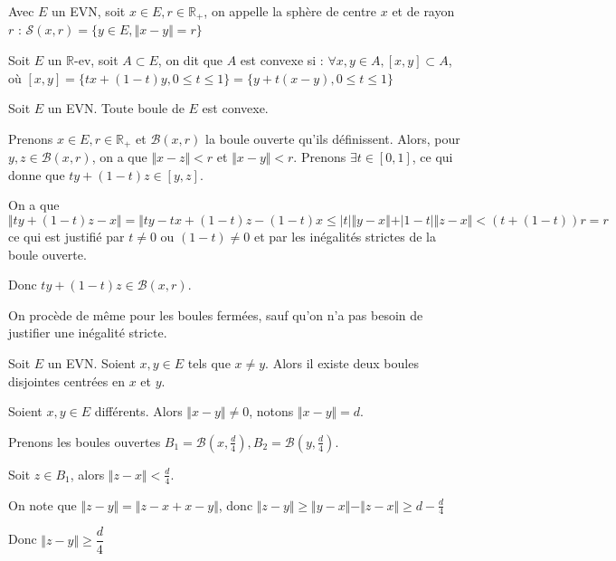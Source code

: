 \documentclass[a4paper,12pt]{book}
\newcommand{\Def}[2]{\begin{tcolorbox}[sharp corners, colback=white,colframe=blue!90!black!75, title=Définition : #1]#2\end{tcolorbox}}
\newcommand{\Prop}[2]{\begin{tcolorbox}[sharp corners, colback=white,colframe=red!90!black!75, title=Proposition : #1]#2\end{tcolorbox}}
\newcommand{\Pre}[1]{\begin{tcolorbox}[sharp corners, colback=white,colframe=green!60!green!30!black!75, title=Preuve]#1\end{tcolorbox}}
\def\R{\mathbb{R}}
\begin{document}
\Def{Sphère}{Avec $E$ un EVN, soit $x\in E, r\in\R_+$, on appelle la sphère de centre $x$ et de rayon $r$ : $\mathcal{S}(x,r)=\{y\in E, \Vert x-y\Vert=r\}$}
\Def{Partie convexe}{Soit $E$ un $\R$-ev, soit $A\subset E$, on dit que $A$ est convexe si : $\forall x,y\in A, [x,y]\subset A$, où $[x,y] = \{tx + (1-t)y, 0\leq t\leq 1\} = \{y+t(x-y), 0\leq t\leq 1\}$}
\Prop{Convexité des boules}{Soit $E$ un EVN. Toute boule de $E$ est convexe.}
\Pre{Prenons $x\in E, r\in\R_+$ et $\mathcal{B}(x,r)$ la boule ouverte qu'ils définissent. Alors, pour $y,z\in \mathcal{B}(x,r)$, on a que $\Vert x-z\Vert< r$ et $\Vert x- y\Vert<r$. Prenons $\exists t\in[0,1]$, ce qui donne que $ty+(1-t)z\in [y,z]$.
\par On a que $\Vert ty + (1-t)z - x\Vert = \Vert ty - tx + (1-t)z - (1-t)x\leq\vert t\vert\Vert y-x\Vert + \vert 1-t\vert\Vert z-x\Vert < (t+(1-t))r = r$ ce qui est justifié par $t\neq0$ ou $(1-t)\neq0$ et par les inégalités strictes de la boule ouverte.
\par Donc $ty+(1-t)z\in\mathcal{B}(x,r)$.
\par On procède de même pour les boules fermées, sauf qu'on n'a pas besoin de justifier une inégalité stricte.}
\Prop{Séparabilité}{Soit $E$ un EVN. Soient $x,y\in E$ tels que $x\neq y$. Alors il existe deux boules disjointes centrées en $x$ et $y$.}
\Pre{Soient $x,y\in E$ différents. Alors $\Vert x-y\Vert \neq 0$, notons $\Vert x-y\Vert = d$.
\par Prenons les boules ouvertes $B_1 = \mathcal{B}(x,\frac{d}{4}), B_2 = \mathcal{B}(y,\frac{d}{4})$.
\par Soit $z\in B_1$, alors $\Vert z-x\Vert<\frac{d}{4}$.
\par On note que $\Vert z-y\Vert = \Vert z-x+x-y\Vert$, donc $\Vert z-y\Vert\geq\Vert y-x\Vert-\Vert z-x\Vert\geq d-\frac{d}{4}$
\par Donc $\Vert z-y\Vert\geq \dfrac{d}{4}$}
\end{document}
